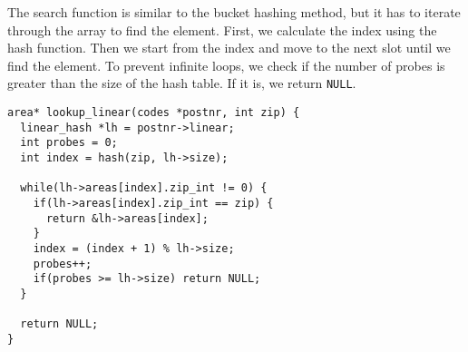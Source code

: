 \documentclass[a4paper,11pt]{article}
\begin{document}
The search function is similar to the bucket hashing method, but it has to iterate through the array to find the element.
First, we calculate the index using the hash function. Then we start from the index and move to the next slot until we find the element.
To prevent infinite loops, we check if the number of probes is greater than the size of the hash table.
If it is, we return {\tt NULL}.

\begin{verbatim}
area* lookup_linear(codes *postnr, int zip) {
  linear_hash *lh = postnr->linear;
  int probes = 0;
  int index = hash(zip, lh->size);
  
  while(lh->areas[index].zip_int != 0) {
    if(lh->areas[index].zip_int == zip) {
      return &lh->areas[index];
    }
    index = (index + 1) % lh->size;
    probes++;
    if(probes >= lh->size) return NULL;
  }
  
  return NULL;
}
\end{verbatim}
\end{document}
